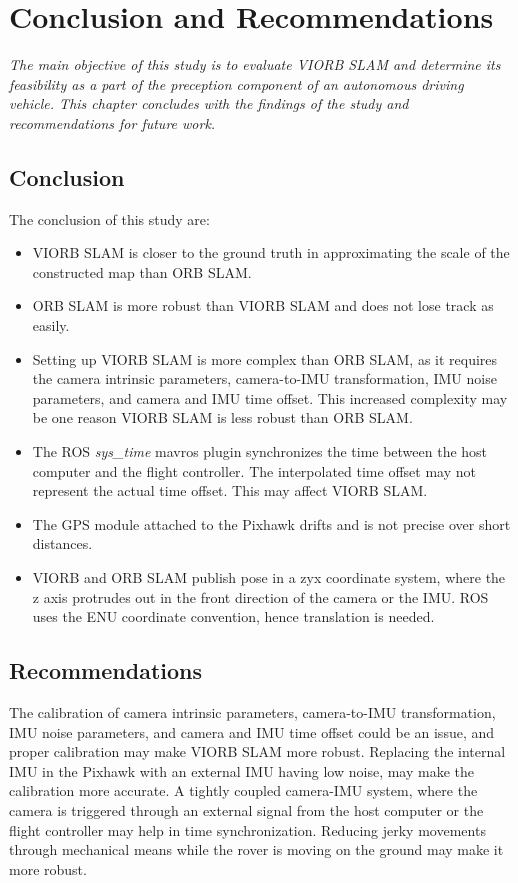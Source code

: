 \setlength{\footskip}{8mm}

\chapter{Conclusion and Recommendations}
\label{ch:conclusion}

\textit{The main objective of this study is to evaluate VIORB SLAM and determine its feasibility as a part of the preception component of an autonomous driving vehicle. This chapter concludes with the findings of the study and recommendations for future work.}

\section{Conclusion}
The conclusion of this study are:
\begin{itemize}
	\item VIORB SLAM is closer to the ground truth in approximating the scale of the constructed map than ORB SLAM.
	\item ORB SLAM is more robust than VIORB SLAM and does not lose track as easily.
	\item Setting up VIORB SLAM is more complex than ORB SLAM, as it requires the camera intrinsic parameters, camera-to-IMU transformation, IMU noise parameters, and camera and IMU time offset. This increased complexity may be one reason VIORB SLAM is less robust than ORB SLAM.
	\item The ROS \textit{sys\_time} mavros plugin synchronizes the time between the host computer and the flight controller. The interpolated time offset may not represent the actual time offset. This may affect VIORB SLAM.
	\item The GPS module attached to the Pixhawk drifts and is not precise over short distances.
	\item VIORB and ORB SLAM publish pose in a zyx coordinate system, where the z axis protrudes out in the front direction of the camera or the IMU. ROS uses the ENU coordinate convention, hence translation is needed. 
\end{itemize}

\section{Recommendations}
The calibration of camera intrinsic parameters, camera-to-IMU transformation, IMU noise parameters, and camera and IMU time offset could be an issue, and proper calibration may make VIORB SLAM more robust. Replacing the internal IMU in the Pixhawk with an external IMU having low noise, may make the calibration more accurate. A tightly coupled camera-IMU system, where the camera is triggered through an external signal from the host computer or the flight controller may help in time synchronization. Reducing jerky movements through mechanical means while the rover is moving on the ground may make it more robust.
\FloatBarrier

